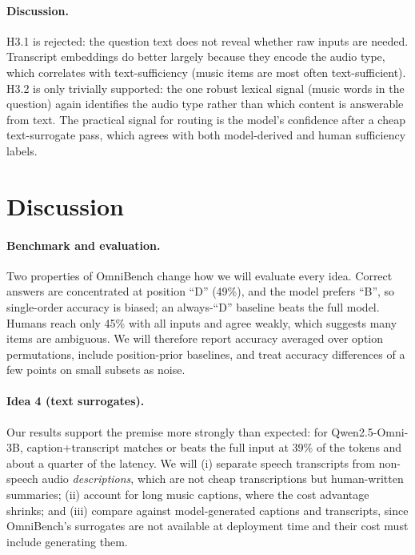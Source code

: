 \documentclass{article}
\begin{document}
\paragraph{Discussion.} H3.1 is rejected: the question text does not reveal
whether raw inputs are needed. Transcript embeddings do better largely because
they encode the audio type, which correlates with text-sufficiency (music items
are most often text-sufficient). H3.2 is only trivially supported: the one robust
lexical signal (music words in the question) again identifies the audio type
rather than which content is answerable from text. The
practical signal for routing is the model's confidence after a cheap
text-surrogate pass, which agrees with both model-derived and human sufficiency
labels.

\section{Discussion}
\label{sec:discussion}

\paragraph{Benchmark and evaluation.} Two properties of OmniBench change how we
will evaluate every idea. Correct answers are concentrated at position ``D''
(49\%), and the model prefers ``B'', so single-order accuracy is biased; an
always-``D'' baseline beats the full model. Humans reach only 45\% with all
inputs and agree weakly, which suggests many items are ambiguous. We will
therefore report accuracy averaged over option permutations, include
position-prior baselines, and treat accuracy differences of a few points on
small subsets as noise.

\paragraph{Idea 4 (text surrogates).} Our results support the premise more
strongly than expected: for Qwen2.5-Omni-3B, caption+transcript matches or beats
the full input at 39\% of the tokens and about a quarter of the latency. We will
(i) separate speech transcripts from non-speech audio \emph{descriptions},
which are not cheap transcriptions but human-written summaries; (ii) account for
long music captions, where the cost advantage shrinks; and (iii) compare against
model-generated captions and transcripts, since OmniBench's surrogates are not
available at deployment time and their cost must include generating them.
\end{document}
